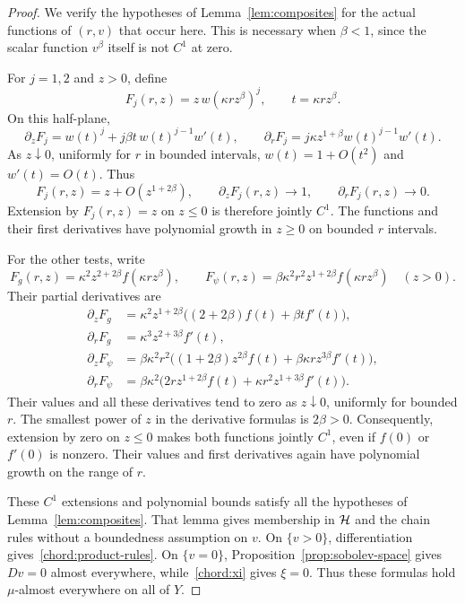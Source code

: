 \begin{proof}
We verify the hypotheses of Lemma~\ref{lem:composites} for the
actual functions of $(r,v)$ that occur here. This is necessary
when $\beta<1$, since the scalar function $v^\beta$ itself is
not $C^1$ at zero.

For $j=1,2$ and $z>0$, define
\[
 F_j(r,z)=z\,w(\kappa r z^\beta)^j,
 \qquad t=\kappa r z^\beta.
\]
On this half-plane,
\[
 \partial_zF_j=w(t)^j+j\beta t\,w(t)^{j-1}w'(t),\qquad
 \partial_rF_j=j\kappa z^{1+\beta}w(t)^{j-1}w'(t).
\]
As $z\downarrow0$, uniformly for $r$ in bounded intervals,
$w(t)=1+O(t^2)$ and $w'(t)=O(t)$. Thus
\[
 F_j(r,z)=z+O(z^{1+2\beta}),\qquad
 \partial_zF_j(r,z)\longrightarrow1,
 \qquad \partial_rF_j(r,z)\longrightarrow0.
\]
Extension by $F_j(r,z)=z$ on $z\le0$ is therefore jointly $C^1$.
The functions and their first derivatives have polynomial growth
in $z\ge0$ on bounded $r$ intervals.

For the other tests, write
\[
 F_g(r,z)=\kappa^2z^{2+2\beta}f(\kappa r z^\beta),\qquad
 F_\psi(r,z)=\beta\kappa^2r^2z^{1+2\beta}
                          f(\kappa r z^\beta)
 \quad(z>0).
\]
Their partial derivatives are
\begin{align*}
 \partial_zF_g
   &=\kappa^2z^{1+2\beta}
                  \bigl((2+2\beta)f(t)+\beta t f'(t)\bigr),\\
 \partial_rF_g
   &=\kappa^3z^{2+3\beta}f'(t),\\
 \partial_zF_\psi
   &=\beta\kappa^2r^2
       \bigl((1+2\beta)z^{2\beta}f(t)
                    +\beta\kappa r z^{3\beta}f'(t)\bigr),\\
 \partial_rF_\psi
   &=\beta\kappa^2
       \bigl(2r z^{1+2\beta}f(t)
                    +\kappa r^2z^{1+3\beta}f'(t)\bigr).
\end{align*}
Their values and all these derivatives tend to zero as
$z\downarrow0$, uniformly for bounded $r$. The smallest power
of $z$ in the derivative formulas is $2\beta>0$. Consequently,
extension by zero on $z\le0$ makes both functions jointly $C^1$,
even if $f(0)$ or $f'(0)$ is nonzero. Their values and first
derivatives again have polynomial growth on the range of $r$.

These $C^1$ extensions and polynomial bounds satisfy all the
hypotheses of Lemma~\ref{lem:composites}. That lemma gives membership
in $\mathcal H$ and the chain rules without a boundedness assumption on $v$.
On $\{v>0\}$, differentiation gives~\eqref{chord:product-rules}.
On $\{v=0\}$, Proposition~\ref{prop:sobolev-space} gives $Dv=0$
almost everywhere, while~\eqref{chord:xi} gives $\xi=0$.
Thus these formulas hold $\mu$-almost everywhere on all of $Y$.
\end{proof}

